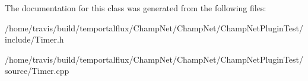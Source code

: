 The documentation for this class was generated from the following files\-:\begin{DoxyCompactItemize}
\item 
/home/travis/build/temportalflux/\-Champ\-Net/\-Champ\-Net/\-Champ\-Net\-Plugin\-Test/include/Timer.\-h\item 
/home/travis/build/temportalflux/\-Champ\-Net/\-Champ\-Net/\-Champ\-Net\-Plugin\-Test/source/Timer.\-cpp\end{DoxyCompactItemize}
